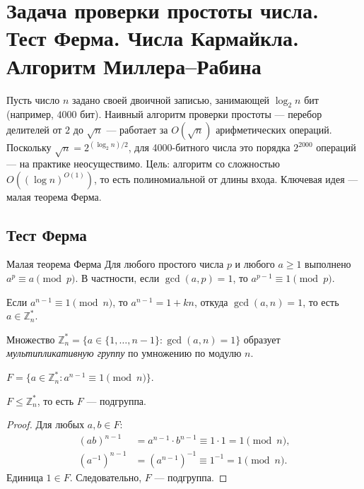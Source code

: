 
\section{Задача проверки простоты числа. Тест Ферма. Числа Кармайкла. Алгоритм Миллера--Рабина}

Пусть число $n$ задано своей двоичной записью, занимающей $\log_2 n$ бит (например, $4000$ бит). Наивный алгоритм проверки простоты --- перебор делителей от $2$ до $\sqrt{n}$ --- работает за $O(\sqrt{n})$ арифметических операций. Поскольку $\sqrt{n} = 2^{(\log_2 n)/2}$, для 4000-битного числа это порядка $2^{2000}$ операций --- на практике неосуществимо. Цель: алгоритм со сложностью $O\!\left((\log n)^{O(1)}\right)$, то есть полиномиальной от длины входа. Ключевая идея --- малая теорема Ферма.

\subsection{Тест Ферма}

\begin{Theorem}{Малая теорема Ферма}{}
	Для любого простого числа $p$ и любого $a \geq 1$ выполнено $a^p \equiv a \pmod{p}$. В частности, если $\gcd(a,p)=1$, то $a^{p-1} \equiv 1 \pmod{p}$.
\end{Theorem}

Если $a^{n-1} \equiv 1 \pmod{n}$, то $a^{n-1} = 1 + kn$, откуда $\gcd(a,n) = 1$, то есть $a \in \mathbb{Z}_n^*$.

\begin{Definition}{}{}
	Множество $\mathbb{Z}_n^* = \{a \in \{1,\ldots,n-1\} : \gcd(a,n)=1\}$ образует \emph{мультипликативную группу} по умножению по модулю $n$.
\end{Definition}

\begin{Definition}{}{}
	$F = \{a \in \mathbb{Z}_n^* : a^{n-1} \equiv 1 \pmod{n}\}$.
\end{Definition}

\begin{Statement}{}{}
	$F \leq \mathbb{Z}_n^*$, то есть $F$ --- подгруппа.
\end{Statement}

\begin{proof}
	Для любых $a,b \in F$:
	\begin{align*}
		(ab)^{n-1} &= a^{n-1} \cdot b^{n-1} \equiv 1 \cdot 1 = 1 \pmod{n},\\
		(a^{-1})^{n-1} &= (a^{n-1})^{-1} \equiv 1^{-1} = 1 \pmod{n}.
	\end{align*}
	Единица $1 \in F$. Следовательно, $F$ --- подгруппа.
\end{proof}

